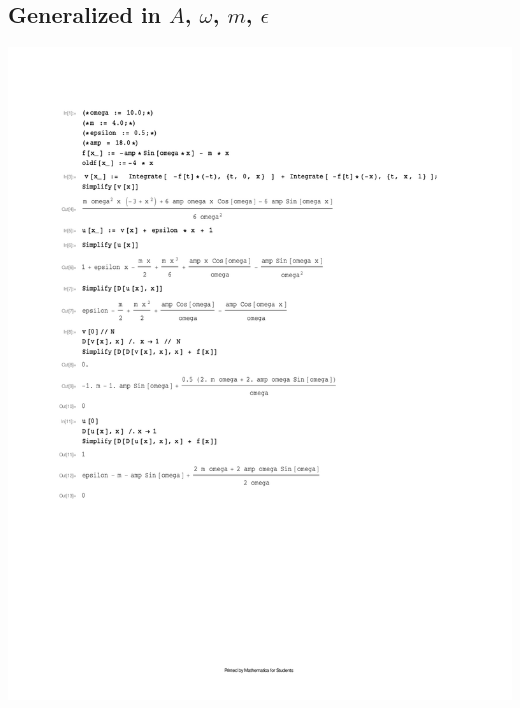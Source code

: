 \documentclass[10pt]{article}
\begin{document}
\subsection{Generalized in $A$, $\omega$, $m$, $\epsilon$}
\includegraphics[width=\columnwidth,keepaspectratio=true]{hw7-mathematica-general.pdf}

\pagebreak
\end{document}
